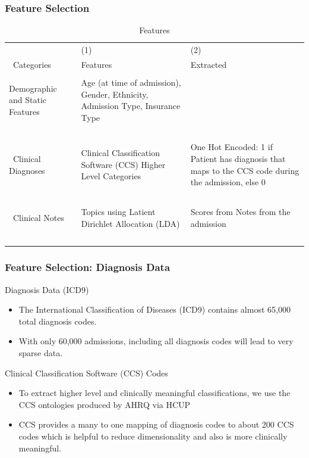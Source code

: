 \documentclass{beamer}
\begin{document}
\begin{frame}
\label{Empirical Design}
\frametitle{Feature Selection}

\begin{table}[H]
\tiny
{}%
\caption{Features}
\label{Features}
\centering
\begin{tabularx}{\textwidth}{l C C}\hline
 & (1) & (2) \\\
Categories & Features & Extracted \\ \hline
 &  &   \\
Demographic and Static Features & Age (at time of admission), Gender, Ethnicity, Admission Type, Insurance Type &  \\\
\\\
Clinical Diagnoses & Clinical Classification Software (CCS) Higher Level Categories & One Hot Encoded: 1 if Patient has diagnosis that maps to the CCS code during the admission, else 0 \\\
\\\
Clinical Notes & Topics using Latient Dirichlet Allocation (LDA) & Scores from Notes from the admission \\\
\end{tabularx}
\end{table}
\end{frame}

\begin{frame}
\label{Feature Selection: CCS}
\frametitle{Feature Selection: Diagnosis Data}

Diagnosis Data (ICD9)
\begin{itemize}
\item The International Classification of Diseases (ICD9) contains almost 65,000 total diagnosis codes.
\item With only 60,000 admissions, including all diagnosis codes will lead to very sparse data.
\end{itemize}

Clinical Classification Software (CCS) Codes

\begin{itemize}
\item To extract higher level and clinically meaningful classifications, we use the CCS ontologies produced by AHRQ via HCUP
\item CCS provides a many to one mapping of diagnosis codes to about 200 CCS codes which is helpful to reduce dimensionality and also is more clinically meaningful.
\end{itemize}
\end{frame}
\end{document}
